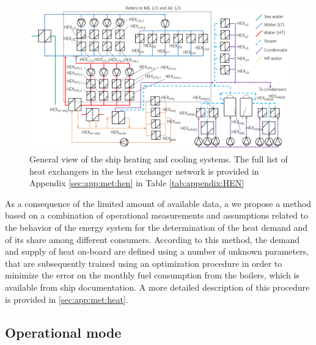 \documentclass[preprint,12pt]{elsarticle}
\begin{document}
\begin{figure}
	\centering
	\includegraphics[width=0.999\linewidth]{Figures/Heating_cooling_systems}
	\caption{General view of the ship heating and cooling systems. The full list of heat exchangers in the heat exchanger network is provided in Appendix \ref{sec:app:met:hen} in Table \ref{tab:appendix:HEN}}
	\label{fig:ship:general}
\end{figure}

 As a consequence of the limited amount of available data, a we propose a method based on a combination of operational measurements and assumptions related to the behavior of the energy system for the determination of the heat demand and of its share among different consumers. According to this method, the demand and supply of heat on-board are defined using a number of unknown parameters, that are subsequently trained using an optimization procedure in order to minimize the error on the monthly fuel consumption from the boilers, which is available from ship documentation. A more detailed description of this procedure is provided in \ref{sec:app:met:heat}.




\subsection{Operational mode} \label{sec:met:operationalMode}
\end{document}
